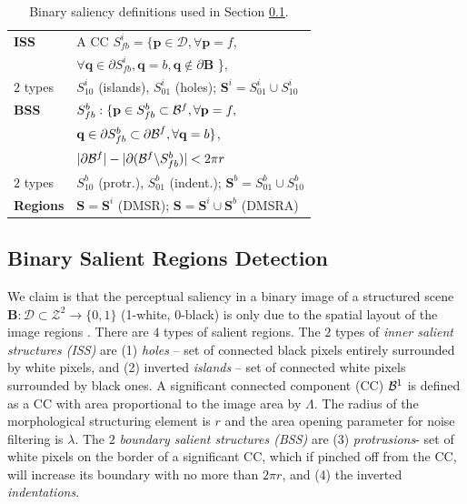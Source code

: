 \documentclass{article}
\def\B{{\mathbf B}}
\def\mcD{{\mathcal{D}}}
\def\p{{\mathbf p}}
\def\q{{\mathbf q}}
\def\S{{\mathbf S}}
\begin{document}
\begin{table}[hbt]
\begin{minipage}[b]{0.99\linewidth}\begin{tabular}{|l l|}
\hline
{\bf ISS} & A CC $S^i_{fb} = \{\p \in \mcD, \forall \p=f,$\\&$\forall \q \in \partial S^i_{fb}, \q=b, \q \notin \partial \B $ \},\\
$2$ types & $S^i_{10}$ (islands), $S^i_{01}$  (holes); $\S^i = S_{01}^i \cup S_{10}^i$\\
{\bf BSS} &  $S_{fb}^b: \{\p \in S_{fb}^b \subset{\cal B}^f, \forall \p = f,$\\&$ \q \in \partial S_{fb}^b \subset {\partial \cal B}^f,\forall \q = b \}$, \\
& $|\partial {\cal B}^f| - |\partial ({\cal B}^f \backslash S_{fb}^b)| < 2 \pi r$\\
$2$ types & $S^b_{10}$ (protr.), $S^b_{01}$ (indent.); $\S^b = S_{01}^b \cup S_{10}^b$\\
{\bf Regions} &  $\S = \S^i$ (DMSR); $\S = \S^i \cup \S^b$ (DMSRA)  \\
\hline
\end{tabular}
\hfill
\centering
\caption{Binary saliency definitions used in Section \ref{ssec:binary}.}\label{table:binary_sal}
\end{minipage}
\vspace*{-0.4cm}
\end{table}


\subsection{Binary Salient Regions Detection}
\label{ssec:binary}
We claim is that the perceptual saliency in a binary image of a structured scene 
 $\B: \mcD \subset \mathcal{Z}^2 \rightarrow \{0,1\}$ (1-white, 0-black)
is only due to the spatial layout of the image regions \cite{RangHumpb06}. 
There are  $4$ types of salient regions. The $2$ types of {\em inner salient structures (ISS)} are (1) {\em holes} -- set of connected black pixels entirely surrounded by white pixels, and (2) inverted {\em islands} -- set of connected white pixels surrounded by black ones. A significant connected component (CC) ${\cal B}^1$ is defined as a CC with area proportional to the image area by $\Lambda$. The radius of the morphological structuring element is $r$ and  the area opening parameter for  noise filtering is $\lambda$. The $2$ {\em boundary salient structures (BSS)} are (3) {\em protrusions}- set of white pixels on the border of a significant CC, which if pinched off from the CC, will increase its boundary with no more than $2\pi r$, and (4) the inverted {\em indentations}. 
\end{document}

